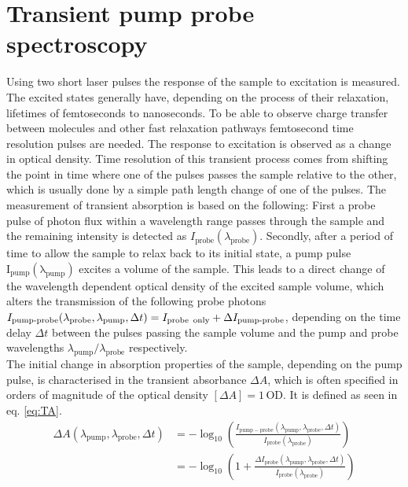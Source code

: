\documentclass[twoside,openright,listof=numbered]{scrreprt}
\begin{document}
\section{Transient pump probe spectroscopy}
Using two short laser pulses the response of the sample to excitation is measured. The excited states generally have, depending on the process of their relaxation, lifetimes of femtoseconds to nanoseconds. To be able to observe charge transfer between molecules and other fast relaxation pathways femtosecond time resolution pulses are needed. The response to excitation is observed as a change in optical density. Time resolution of this transient process comes from shifting the point in time where one of the pulses passes the sample relative to the other, which is usually done by a simple path length change of one of the pulses.\newline
The measurement of transient absorption is based on the following: First a probe pulse of photon flux within a wavelength range passes through the sample and the remaining intensity is detected as $I_\text{probe}(\lambda_\text{probe})$. 
Secondly, after a period of time to allow the sample to relax back to its initial state, a pump pulse $\mathrm{I_{pump}(\lambda_{pump})}$ excites a volume of the sample. This leads to a direct change of the wavelength dependent optical density of the excited sample volume, which alters the transmission of the following probe photons $I_\text{pump-probe}(\lambda_\text{probe}, \lambda_\text{pump}, \Delta t) = I_\text{probe\, only}+\Delta I_\text{pump-probe}$, depending on the time delay $\Delta t$ between the pulses passing the sample volume and the pump and probe wavelengths $\lambda_\text{pump}/\lambda_\text{probe}$ respectively. \\
The initial change in absorption properties of the sample, depending on the pump pulse, is characterised in the transient absorbance $\Delta A$, which is often specified in orders of magnitude of the optical density $\left[\Delta A\right] = 1\, \text{OD}$. It is defined as seen in eq. \ref{eq:TA}.
\begin{equation}\label{eq:TA}
\begin{split}
\Delta A(\lambda_{\mathrm{pump}}, \lambda_{\mathrm{probe}}, \Delta t)&=-\log _{10}\left(\frac{I_{\mathrm{pump}-\mathrm{probe}}\left(\lambda_{\mathrm{pump}}, \lambda_{\mathrm{probe}}, \Delta t\right)}{I_{\mathrm{probe}}\left(\lambda_{\mathrm{probe}}\right)}\right)\\
&=-\log _{10}\left(1+\frac{\Delta I_{\mathrm{probe}}\left(\lambda_{\mathrm{pump}}, \lambda_{\mathrm{probe}}, \Delta t\right)}{I_{\mathrm{probe}}\left(\lambda_{\mathrm{probe}}\right)}\right)
\end{split}
\end{equation}
\end{document}
